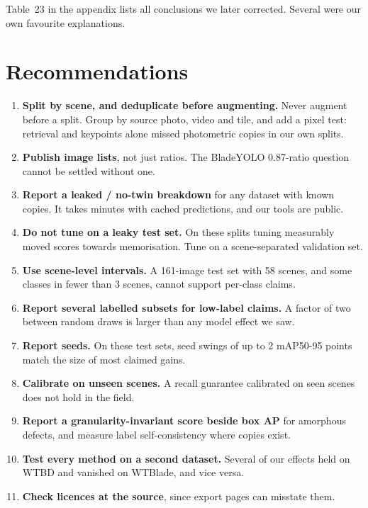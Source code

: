 \documentclass[
  10pt,
]{article}
\providecommand{\tightlist}{%
  \setlength{\itemsep}{0pt}\setlength{\parskip}{0pt}}
\begin{document}
Table~23 in the appendix lists all conclusions we later corrected.
Several were our own favourite explanations.

\section{Recommendations}\label{recommendations}

\begin{enumerate}
\def\labelenumi{\arabic{enumi}.}
\tightlist
\item
  \textbf{Split by scene, and deduplicate before augmenting.} Never
  augment before a split. Group by source photo, video and tile, and add
  a pixel test: retrieval and keypoints alone missed photometric copies
  in our own splits.
\item
  \textbf{Publish image lists}, not just ratios. The BladeYOLO
  0.87-ratio question cannot be settled without one.
\item
  \textbf{Report a leaked / no-twin breakdown} for any dataset with
  known copies. It takes minutes with cached predictions, and our tools
  are public.
\item
  \textbf{Do not tune on a leaky test set.} On these splits tuning
  measurably moved scores towards memorisation. Tune on a
  scene-separated validation set.
\item
  \textbf{Use scene-level intervals.} A 161-image test set with 58
  scenes, and some classes in fewer than 3 scenes, cannot support
  per-class claims.
\item
  \textbf{Report several labelled subsets for low-label claims.} A
  factor of two between random draws is larger than any model effect we
  saw.
\item
  \textbf{Report seeds.} On these test sets, seed swings of up to 2
  mAP50-95 points match the size of most claimed gains.
\item
  \textbf{Calibrate on unseen scenes.} A recall guarantee calibrated on
  seen scenes does not hold in the field.
\item
  \textbf{Report a granularity-invariant score beside box AP} for
  amorphous defects, and measure label self-consistency where copies
  exist.
\item
  \textbf{Test every method on a second dataset.} Several of our effects
  held on WTBD and vanished on WTBlade, and vice versa.
\item
  \textbf{Check licences at the source}, since export pages can misstate
  them.
\end{enumerate}
\end{document}
